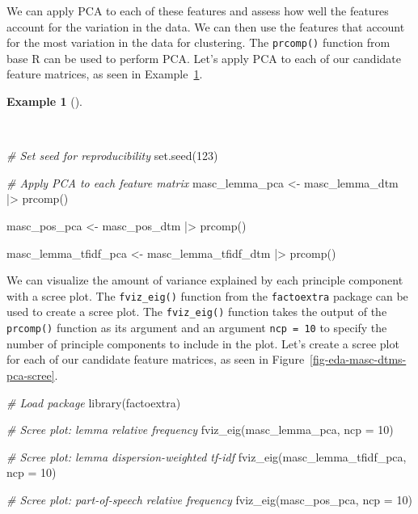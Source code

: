 \documentclass[
  letterpaper,
  DIV=11,
  numbers=noendperiod]{scrreport}
\newenvironment{Shaded}{\begin{snugshade}}{\end{snugshade}}
\newcommand{\AttributeTok}[1]{\textcolor[rgb]{0.00,0.00,0.00}{#1}}
\newcommand{\CommentTok}[1]{\textcolor[rgb]{0.00,0.00,0.00}{\textit{#1}}}
\newcommand{\DecValTok}[1]{\textcolor[rgb]{0.00,0.00,0.00}{#1}}
\newcommand{\FunctionTok}[1]{\textcolor[rgb]{0.00,0.00,0.00}{#1}}
\newcommand{\NormalTok}[1]{\textcolor[rgb]{0.00,0.00,0.00}{#1}}
\newcommand{\OtherTok}[1]{\textcolor[rgb]{0.00,0.00,0.00}{#1}}
\newcommand{\SpecialCharTok}[1]{\textcolor[rgb]{0.00,0.00,0.00}{#1}}
\theoremstyle{definition}
\newtheorem{example}{Example}[chapter]
\theoremstyle{remark}
\begin{document}
We can apply PCA to each of these features and assess how well the
features account for the variation in the data. We can then use the
features that account for the most variation in the data for clustering.
The \texttt{prcomp()} function from base R can be used to perform PCA.
Let's apply PCA to each of our candidate feature matrices, as seen in
Example~\ref{exm-eda-masc-dtms-pca}.

\begin{example}[]\protect\hypertarget{exm-eda-masc-dtms-pca}{}\label{exm-eda-masc-dtms-pca}

~

\begin{Shaded}
\begin{Highlighting}[]
\CommentTok{\# Set seed for reproducibility}
\FunctionTok{set.seed}\NormalTok{(}\DecValTok{123}\NormalTok{) }

\CommentTok{\# Apply PCA to each feature matrix}
\NormalTok{masc\_lemma\_pca }\OtherTok{\textless{}{-}} 
\NormalTok{  masc\_lemma\_dtm }\SpecialCharTok{|\textgreater{}} 
  \FunctionTok{prcomp}\NormalTok{()}

\NormalTok{masc\_pos\_pca }\OtherTok{\textless{}{-}} 
\NormalTok{  masc\_pos\_dtm }\SpecialCharTok{|\textgreater{}} 
  \FunctionTok{prcomp}\NormalTok{()}

\NormalTok{masc\_lemma\_tfidf\_pca }\OtherTok{\textless{}{-}} 
\NormalTok{  masc\_lemma\_tfidf\_dtm }\SpecialCharTok{|\textgreater{}} 
  \FunctionTok{prcomp}\NormalTok{()}
\end{Highlighting}
\end{Shaded}

\end{example}

We can visualize the amount of variance explained by each principle
component with a scree plot. The \texttt{fviz\_eig()} function from the
\texttt{factoextra} package can be used to create a scree plot. The
\texttt{fviz\_eig()} function takes the output of the \texttt{prcomp()}
function as its argument and an argument \texttt{ncp\ =\ 10} to specify
the number of principle components to include in the plot. Let's create
a scree plot for each of our candidate feature matrices, as seen in
Figure~\ref{fig-eda-masc-dtms-pca-scree}.

\begin{Shaded}
\begin{Highlighting}[]
\CommentTok{\# Load package}
\FunctionTok{library}\NormalTok{(factoextra)}

\CommentTok{\# Scree plot: lemma relative frequency}
\FunctionTok{fviz\_eig}\NormalTok{(masc\_lemma\_pca, }\AttributeTok{ncp =} \DecValTok{10}\NormalTok{)}

\CommentTok{\# Scree plot: lemma dispersion{-}weighted tf{-}idf}
\FunctionTok{fviz\_eig}\NormalTok{(masc\_lemma\_tfidf\_pca, }\AttributeTok{ncp =} \DecValTok{10}\NormalTok{)}

\CommentTok{\# Scree plot: part{-}of{-}speech relative frequency}
\FunctionTok{fviz\_eig}\NormalTok{(masc\_pos\_pca, }\AttributeTok{ncp =} \DecValTok{10}\NormalTok{)}
\end{Highlighting}
\end{Shaded}
\end{document}
